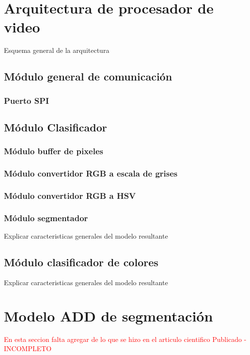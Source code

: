 \documentclass[twoside,spanish,ESP,MSc]{plantillaLabUPV}
\theoremstyle{definition}
\begin{document}
\section{Arquitectura de procesador de video}

Esquema general de la arquitectura

\subsection{Módulo general de comunicación}
\subsubsection{Puerto SPI}


\subsection{Módulo Clasificador}

\subsubsection{Módulo buffer de pixeles}

\subsubsection{Módulo convertidor RGB a escala de grises}

\subsubsection{Módulo convertidor RGB a HSV}

\subsubsection{Módulo segmentador}
Explicar caracteristicas generales del modelo resultante

\subsection{Módulo clasificador de colores}
Explicar caracteristicas generales del modelo resultante

\section{Modelo ADD de segmentación}
\textcolor{red}{En esta seccion falta agregar de lo que se hizo en el articulo cientifico Publicado - INCOMPLETO}
\end{document}
